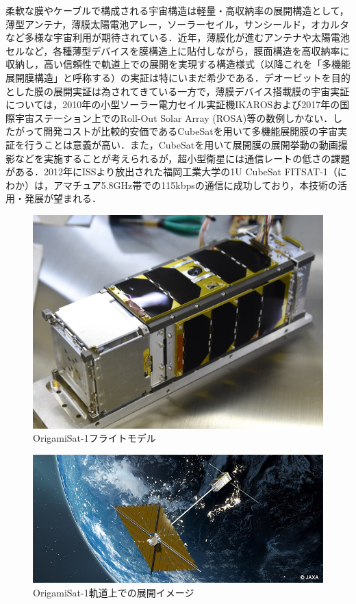 柔軟な膜やケーブルで構成される宇宙構造は軽量・高収納率の展開構造として，薄型アンテナ，薄膜太陽電池アレー，ソーラーセイル，サンシールド，オカルタなど多様な宇宙利用が期待されている．近年，薄膜化が進むアンテナや太陽電池セルなど，各種薄型デバイスを膜構造上に貼付しながら，膜面構造を高収納率に収納し，高い信頼性で軌道上での展開を実現する構造様式（以降これを「多機能展開膜構造」と呼称する）の実証は特にいまだ希少である．デオービットを目的とした膜の展開実証は為されてきている一方で，薄膜デバイス搭載膜の宇宙実証については，2010年の小型ソーラー電力セイル実証機IKAROSおよび2017年の国際宇宙ステーション上でのRoll-Out Solar Array (ROSA)等の数例しかない．したがって開発コストが比較的安価であるCubeSatを用いて多機能展開膜の宇宙実証を行うことは意義が高い．また，CubeSatを用いて展開膜の展開挙動の動画撮影などを実施することが考えられるが，超小型衛星には通信レートの低さの課題がある．2012年にISSより放出された福岡工業大学の1U CubeSat FITSAT-1（にわか）は，アマチュア5.8GHz帯での115kbpsの通信に成功しており\cite{Tanak15acta}，本技術の活用・発展が望まれる．
\begin{figure}[H]
	\centering
	\includegraphics[width=0.7\linewidth]{01/fig/1-1-1.jpg}
	\caption{OrigamiSat-1フライトモデル}
	\label{fig1-1-1}
\end{figure}
\begin{figure}[H]
	\centering
	\includegraphics[width=1\linewidth]{01/fig/1-1-2.jpg}
	\caption{OrigamiSat-1軌道上での展開イメージ}
	\label{fig1-1-2}
\end{figure}

